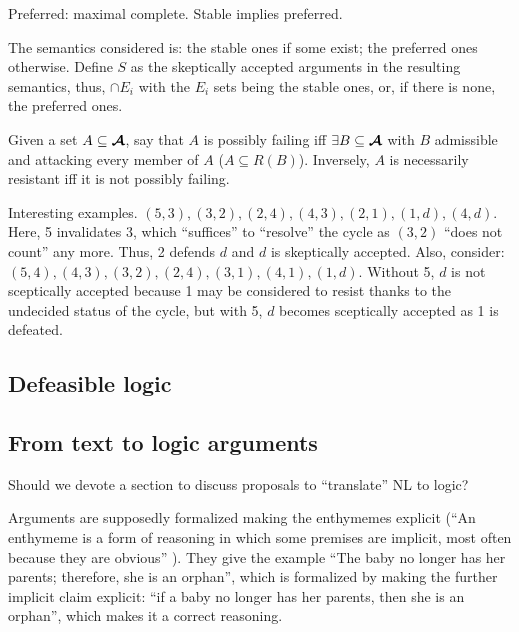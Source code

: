 \documentclass[version=3.21, pagesize, twoside=off, bibliography=totoc, DIV=calc, fontsize=12pt, a4paper, french, english]{scrartcl}
\begin{document}
Preferred: maximal complete. Stable implies preferred. 

The semantics considered is: the stable ones if some exist; the preferred ones otherwise. Define $S$ as the skeptically accepted arguments in the resulting semantics, thus, $\cap E_i$ with the $E_i$ sets being the stable ones, or, if there is none, the preferred ones.

Given a set $A \subseteq \bm{\mathcal{A}}$, say that $A$ is possibly failing iff $\exists B \subseteq \bm{\mathcal{A}}$ with $B$ admissible and attacking every member of $A$ ($A \subseteq R(B)$).
Inversely, $A$ is necessarily resistant iff it is not possibly failing.

Interesting examples. $(5, 3), (3, 2), (2, 4), (4, 3), (2, 1), (1, d), (4, d)$. Here, 5 invalidates 3, which “suffices” to “resolve” the cycle as $(3, 2)$ “does not count” any more. Thus, 2 defends $d$ and $d$ is skeptically accepted. Also, consider: $(5, 4), (4, 3), (3, 2), (2, 4), (3, 1), (4, 1), (1, d)$. Without 5, $d$ is not sceptically accepted because 1 may be considered to resist thanks to the undecided status of the cycle, but with 5, $d$ becomes sceptically accepted as 1 is defeated.

\subsection{Defeasible logic}

\subsection{From text to logic arguments}
Should we devote a section to discuss proposals to “translate” NL to logic?

Arguments are supposedly formalized making the enthymemes explicit (“An enthymeme is a form of reasoning in which some premises are implicit, most often because they are obvious” \citep[p.\ 41]{besnard_elements_2000}). They give the example “The baby no longer has her parents; therefore, she is an orphan”, which is formalized by making the further implicit claim explicit: “if a baby no longer has her parents, then she is an orphan”, which makes it a correct reasoning. 
\end{document}
